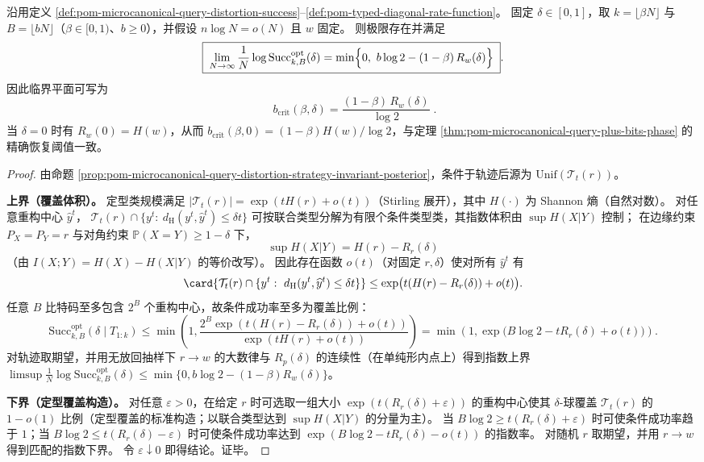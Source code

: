 \begin{theorem}\label{thm:pom-microcanonical-query-distortion-strong-converse-plane}
沿用定义 \ref{def:pom-microcanonical-query-distortion-success}--\ref{def:pom-typed-diagonal-rate-function}。
固定 \(\delta\in[0,1]\)，取 \(k=\lfloor\beta N\rfloor\) 与 \(B=\lfloor bN\rfloor\)（\(\beta\in[0,1)\)、\(b\ge 0\)），并假设 \(n\log N=o(N)\) 且 \(w\) 固定。
则极限存在并满足
\[
\boxed{\;
\lim_{N\to\infty}\frac{1}{N}\log \mathrm{Succ}^{\mathrm{opt}}_{k,B}(\delta)
=\min\Bigl\{0,\ b\log 2-(1-\beta)\,R_w(\delta)\Bigr\}\; }.
\]
因此临界平面可写为
\[
\boxed{\;
b_{\mathrm{crit}}(\beta,\delta)=\frac{(1-\beta)\,R_w(\delta)}{\log 2}\; } .
\]
当 \(\delta=0\) 时有 \(R_w(0)=H(w)\)，从而 \(b_{\mathrm{crit}}(\beta,0)=(1-\beta)H(w)/\log 2\)，与定理 \ref{thm:pom-microcanonical-query-plus-bits-phase} 的精确恢复阈值一致。
\end{theorem}
\begin{proof}
由命题 \ref{prop:pom-microcanonical-query-distortion-strategy-invariant-posterior}，条件于轨迹后源为 \(\mathrm{Unif}(\mathcal{T}_t(r))\)。
\par
\textbf{上界（覆盖体积）。}
定型类规模满足 \(|\mathcal{T}_t(r)|=\exp(tH(r)+o(t))\)（Stirling 展开），其中 \(H(\cdot)\) 为 Shannon 熵（自然对数）。
对任意重构中心 \(\widehat y^t\)，
\(\mathcal{T}_t(r)\cap\{y^t:\ d_{\mathrm H}(y^t,\widehat y^t)\le \delta t\}\)
可按联合类型分解为有限个条件类型类，其指数体积由 \(\sup H(X|Y)\) 控制；
在边缘约束 \(P_X=P_Y=r\) 与对角约束 \(\mathbb{P}(X=Y)\ge 1-\delta\) 下，
\[
\sup H(X|Y)=H(r)-R_r(\delta)
\]
（由 \(I(X;Y)=H(X)-H(X|Y)\) 的等价改写）。
因此存在函数 \(o(t)\)（对固定 \(r,\delta\)）使对所有 \(\widehat y^t\) 有
\[
\card{\mathcal{T}_t(r)\cap\{y^t:\ d_{\mathrm H}(y^t,\widehat y^t)\le \delta t\}}
\le \exp\bigl(t(H(r)-R_r(\delta))+o(t)\bigr).
\]
任意 \(B\) 比特码至多包含 \(2^B\) 个重构中心，故条件成功率至多为覆盖比例：
\[
\mathrm{Succ}^{\mathrm{opt}}_{k,B}(\delta\mid T_{1:k})
\le
\min\!\left(1,\frac{2^B\exp(t(H(r)-R_r(\delta))+o(t))}{\exp(tH(r)+o(t))}\right)
=\min\!\left(1,\exp\bigl(B\log 2-tR_r(\delta)+o(t)\bigr)\right).
\]
对轨迹取期望，并用无放回抽样下 \(r\to w\) 的大数律与 \(R_p(\delta)\) 的连续性（在单纯形内点上）得到指数上界
\(\limsup \frac1N\log \mathrm{Succ}^{\mathrm{opt}}_{k,B}(\delta)\le \min\{0,b\log 2-(1-\beta)R_w(\delta)\}\)。
\par
\textbf{下界（定型覆盖构造）。}
对任意 \(\varepsilon>0\)，在给定 \(r\) 时可选取一组大小 \(\exp(t(R_r(\delta)+\varepsilon))\) 的重构中心使其 \(\delta\)-球覆盖 \(\mathcal{T}_t(r)\) 的 \(1-o(1)\) 比例（定型覆盖的标准构造；以联合类型达到 \(\sup H(X|Y)\) 的分量为主）。
当 \(B\log 2\ge t(R_r(\delta)+\varepsilon)\) 时可使条件成功率趋于 \(1\)；当 \(B\log 2\le t(R_r(\delta)-\varepsilon)\) 时可使条件成功率达到
\(\exp(B\log 2-tR_r(\delta)-o(t))\) 的指数率。
对随机 \(r\) 取期望，并用 \(r\to w\) 得到匹配的指数下界。
令 \(\varepsilon\downarrow 0\) 即得结论。证毕。
\end{proof}

